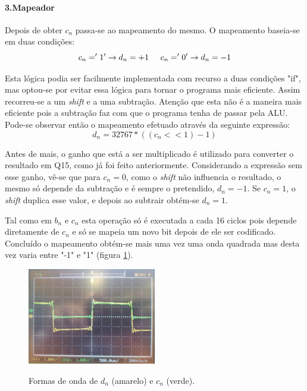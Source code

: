 \documentclass[11pt]{article}
\numberwithin{equation}{section}
\begin{document}
\paragraph{3.Mapeador} \hspace{0pt}
\label{para:P2-3}

Depois de obter $ c_n $ passa-se ao mapeamento do mesmo. O mapeamento baseia-se em duas condições:
\begin{equation}
	c_n= '1' \rightarrow d_n =+1 \hspace{5 mm} c_n='0' \rightarrow d_n=-1
\end{equation}

Esta lógica podia ser facilmente implementada com recurso a duas condições "if", mas optou-se por evitar essa lógica para tornar o programa mais eficiente.
Assim recorreu-se a um \textit{shift} e a uma subtração. Atenção que esta não é a maneira mais eficiente pois a subtração faz com que o programa tenha de passar pela ALU.
Pode-se observar então o mapeamento efetuado através da seguinte expressão:
\begin{equation}
d_n=32767*((c_n << 1)-1)
\end{equation}

Antes de mais, o ganho que está a ser multiplicado é utilizado para converter o resultado em Q15, como já foi feito anteriormente. Considerando a expressão sem esse ganho, vê-se que para $ c_n=0 $, como o \textit{shift} não influencia o resultado, o mesmo só depende da subtração e é sempre o pretendido, $d_n=-1$. Se $c_n=1$, o \textit{shift} duplica  esse valor, e depois ao subtrair obtém-se $d_n=1$.

Tal como em $b_n$ e $c_n$ esta operação só é executada a cada 16 ciclos pois depende diretamente de $c_n$ e só se mapeia um novo bit depois de ele ser codificado. Concluído o mapeamento obtém-se mais uma vez uma onda quadrada mas desta vez varia entre "-1" e "1" (figura \ref{cn_dn}).
\begin{figure}[H]
	\centering
	\includegraphics[width=0.5\textwidth]{./cn_dn}~\\
	\caption{Formas de onda de $d_n$ (amarelo) e $c_n$ (verde).}
	\label{cn_dn}
\end{figure}
\end{document}
